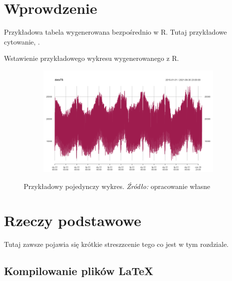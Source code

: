 \documentclass[polish, twoside, 12pt, a4paper]{article}
\theoremstyle{definition}
\theoremstyle{plain}
\theoremstyle{remark}
\begin{document}
\clearpage

\section{Wprowdzenie}

Przykładowa tabela wygenerowana bezpośrednio w R. Tutaj przykładowe cytowanie, \citep{bahmanyar2020impact}.



Wstawienie przykładowego wykresu wygenerowanego z R. 

\begin{figure}[hbt]
  \centering

  \begin{subfigure}[t]{0.45\textwidth}
    \includegraphics[width=\textwidth]{./out_figures/fig1.png}
  \end{subfigure}

  \captionsetup{margin=10pt,font=small,labelfont=bf,width=.8\textwidth}

  \caption[Przykładowy wykres]{Przykładowy pojedynczy wykres. \textit{Źródło:} opracowanie własne}\label{fig:przykladowy-wykres}
\end{figure}

\clearpage
\section{Rzeczy podstawowe}

Tutaj zawsze pojawia się krótkie streszzcenie tego co jest w tym rozdziale.

\subsection{Kompilowanie plików \LaTeX}
\end{document}
